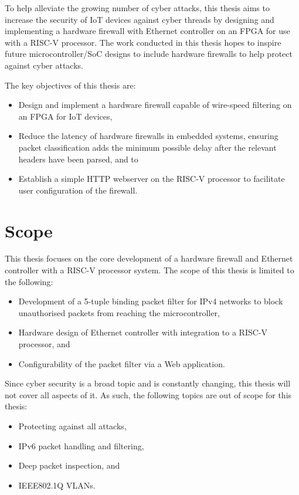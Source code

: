 To help alleviate the growing number of cyber attacks, this thesis aims to increase the security of IoT devices against cyber threads by designing and implementing a hardware firewall with Ethernet controller on an FPGA for use with a RISC-V processor. The work conducted in this thesis hopes to inspire future microcontroller/SoC designs to include hardware firewalls to help protect against cyber attacks. 

The key objectives of this thesis are:

\begin{itemize}
    \item Design and implement a hardware firewall capable of wire-speed filtering on an FPGA for IoT devices,
    \item Reduce the latency of hardware firewalls in embedded systems, ensuring packet classification adds the minimum possible delay after the relevant headers have been parsed, and to
    \item Establish a simple HTTP webserver on the RISC-V processor to facilitate user configuration of the firewall.
\end{itemize}


\section{Scope}

This thesis focuses on the core development of a hardware firewall and Ethernet controller with a RISC-V processor system. The scope of this thesis is limited to the following:

\begin{itemize}
    \item Development of a 5-tuple binding packet filter for IPv4 networks to block unauthorised packets from reaching the microcontroller,
    \item Hardware design of Ethernet controller with integration to a RISC-V processor, and
    \item Configurability of the packet filter via a Web application.
\end{itemize}

Since cyber security is a broad topic and is constantly changing, this thesis will not cover all aspects of it. As such, the following topics are out of scope for this thesis:

\begin{itemize}
    \item Protecting against all attacks,
    \item IPv6 packet handling and filtering,
    \item Deep packet inspection, and 
    \item IEEE802.1Q VLANs.
\end{itemize}
